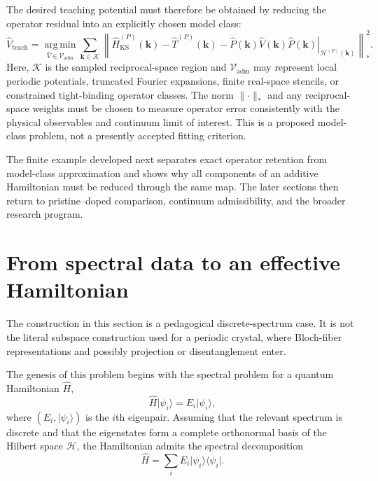 
The desired teaching potential must therefore be obtained by reducing the
operator residual into an explicitly chosen model class:
\begin{equation}
    \hat V_{\mathrm{teach}}
    =
    \operatorname*{arg\,min}_{\hat V\in\mathcal V_{\mathrm{adm}}}
    \sum_{\mathbf k\in\mathcal K}
    \left\|
        \hat H_{\mathrm{KS}}^{(P)}(\mathbf k)
        -
        \hat T^{(P)}(\mathbf k)
        -
        \left.
            \hat P(\mathbf k)
            \hat V(\mathbf k)
            \hat P(\mathbf k)
        \right|_{\mathcal H^{(P)}(\mathbf k)}
    \right\|_*^2.
\end{equation}
Here, $\mathcal K$ is the sampled reciprocal-space region and
$\mathcal V_{\mathrm{adm}}$ may represent local periodic potentials, truncated
Fourier expansions, finite real-space stencils, or constrained tight-binding
operator classes. The norm $\lVert\cdot\rVert_*$ and any reciprocal-space
weights must be chosen to measure operator error consistently with the physical
observables and continuum limit of interest. This is a proposed model-class
problem, not a presently accepted fitting criterion.

The finite example developed next separates exact operator retention from
model-class approximation and shows why all components of an additive
Hamiltonian must be reduced through the same map. The later sections then
return to pristine--doped comparison, continuum admissibility, and the broader
research program.

\section{From spectral data to an effective Hamiltonian}


The construction in this section is a pedagogical discrete-spectrum case. It
is not the literal subspace construction used for a periodic crystal, where
Bloch-fiber representations and possibly projection or disentanglement enter.

The genesis of this problem begins with the spectral problem for a quantum
Hamiltonian $\hat H$,
\begin{equation}
    \hat H\lvert\psi_i\rangle
    =
    E_i\lvert\psi_i\rangle,
\end{equation}
where $(E_i,\lvert\psi_i\rangle)$ is the $i$th eigenpair. Assuming that the
relevant spectrum is discrete and that the eigenstates form a complete
orthonormal basis of the Hilbert space $\mathcal H$, the Hamiltonian admits the
spectral decomposition
\begin{equation}
    \hat H
    =
    \sum_i
    E_i\lvert\psi_i\rangle\langle\psi_i\rvert.
\end{equation}

